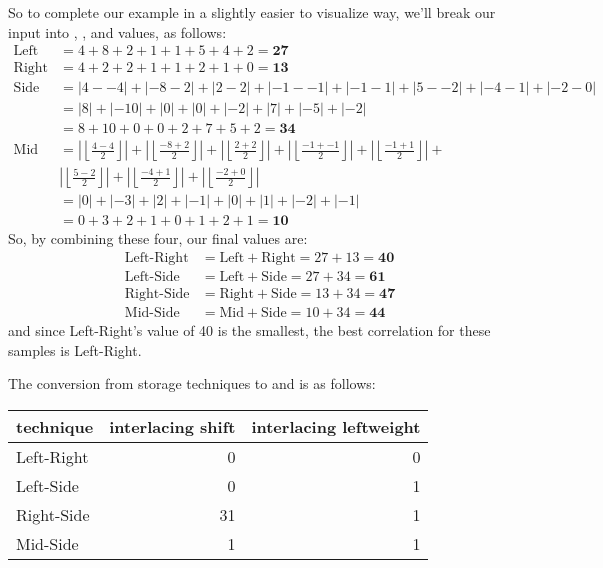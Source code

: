 \clearpage

So to complete our example in a slightly easier to visualize way,
we'll break our input into , , 
and  values, as follows:
\begin{align*}
\text{Left} &= 4 + 8 + 2 + 1 + 1 + 5 + 4 + 2 = \textbf{27} \\
\text{Right} &= 4 + 2 + 2 + 1 + 1 + 2 + 1 + 0 = \textbf{13} \\
\text{Side} &= |4 - -4| + |-8 - 2| + |2 - 2| + |-1 - -1| + |-1 - 1| + |5 - -2| + |-4 - 1| + |-2 - 0| \\
&= |8| + |-10| + |0| + |0| + |-2| + |7| + |-5| + |-2| \\
&= 8 + 10 + 0 + 0 + 2 + 7 + 5 + 2 = \textbf{34} \\
\text{Mid} &= \left\lvert\left\lfloor\frac{4 - 4}{2}\right\rfloor\right\rvert + \left\lvert\left\lfloor\frac{-8 + 2}{2}\right\rfloor\right\rvert + \left\lvert\left\lfloor\frac{2 + 2}{2}\right\rfloor\right\rvert + \left\lvert\left\lfloor\frac{-1 + -1}{2}\right\rfloor\right\rvert + \left\lvert\left\lfloor\frac{-1 + 1}{2}\right\rfloor\right\rvert + \\
& \left\lvert\left\lfloor\frac{5 - 2}{2}\right\rfloor\right\rvert + \left\lvert\left\lfloor\frac{-4 + 1}{2}\right\rfloor\right\rvert + \left\lvert\left\lfloor\frac{-2 + 0}{2}\right\rfloor\right\rvert \\
&= |0| + |-3| + |2| + |-1| + |0| + |1| + |-2| + |-1| \\
&= 0 + 3 + 2 + 1 + 0 + 1 + 2 + 1 = \textbf{10}
\end{align*}
So, by combining these four, our final values are:
\begin{align*}
\text{Left-Right} &= \text{Left} + \text{Right} = 27 + 13 = \textbf{40} \\
\text{Left-Side} &= \text{Left} + \text{Side} = 27 + 34 = \textbf{61} \\
\text{Right-Side} &= \text{Right} + \text{Side} = 13 + 34 = \textbf{47} \\
\text{Mid-Side} &= \text{Mid} + \text{Side} = 10 + 34 = \textbf{44}
\end{align*}
and since Left-Right's value of 40 is the smallest, the best
correlation for these samples is Left-Right.

The conversion from storage techniques to  and
 is as follows:
\begin{table}[h]
\begin{tabular}{|l|r|r|}
\hline
technique & interlacing shift & interlacing leftweight \\
\hline
Left-Right & 0 & 0 \\
Left-Side & 0 & 1 \\
Right-Side & 31 & 1 \\
Mid-Side & 1 & 1 \\
\hline
\end{tabular}
\end{table}

